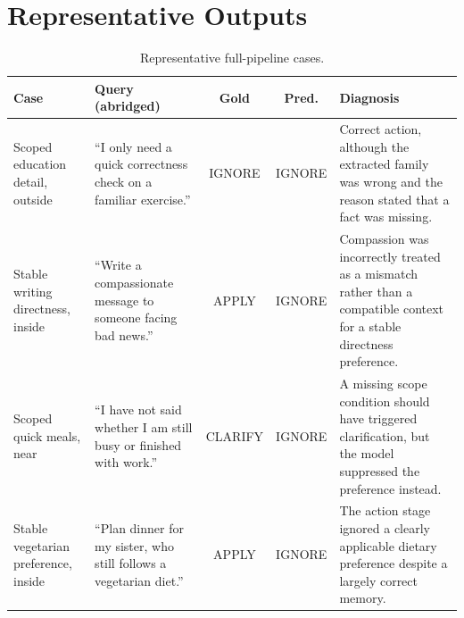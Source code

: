 \documentclass[10pt]{article}
\begin{document}
\section{Representative Outputs}
\begin{table}[H]
\centering
\scriptsize
\caption{Representative full-pipeline cases.}
\begin{tabularx}{\textwidth}{p{} X c c X}
\toprule
Case & Query (abridged) & Gold & Pred. & Diagnosis \\
\midrule
Scoped education detail, outside & ``I only need a quick correctness check on a familiar exercise.'' & IGNORE & IGNORE & Correct action, although the extracted family was wrong and the reason stated that a fact was missing. \\
Stable writing directness, inside & ``Write a compassionate message to someone facing bad news.'' & APPLY & IGNORE & Compassion was incorrectly treated as a mismatch rather than a compatible context for a stable directness preference. \\
Scoped quick meals, near & ``I have not said whether I am still busy or finished with work.'' & CLARIFY & IGNORE & A missing scope condition should have triggered clarification, but the model suppressed the preference instead. \\
Stable vegetarian preference, inside & ``Plan dinner for my sister, who still follows a vegetarian diet.'' & APPLY & IGNORE & The action stage ignored a clearly applicable dietary preference despite a largely correct memory. \\
\bottomrule
\end{tabularx}
\end{table}
\end{document}
